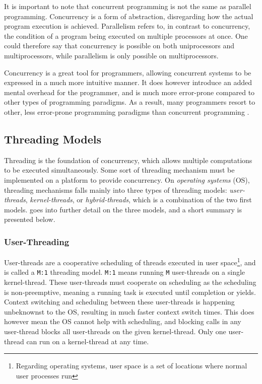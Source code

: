 It is important to note that concurrent programming is not the same as parallel programming. Concurrency is a form of abstraction, disregarding how the actual program execution is achieved. Parallelism refers to, in contrast to concurrency, the condition of a program being executed on multiple processors at once. One could therefore say that concurrency is possible on both uniprocessors and multiprocessors, while parallelism is only possible on multiprocessors.

Concurrency is a great tool for programmers, allowing concurrent systems to be expressed in a much more intuitive manner. It does however introduce an added mental overhead for the programmer, and is much more error\hyp{}prone compared to other types of programming paradigms. As a result, many programmers resort to other, less error\hyp{}prone programming paradigms than concurrent programming \citep{mordechai2006principles}.


\subsection{Threading Models}
\label{subsec:threading_models}


Threading is the foundation of concurrency, which allows multiple computations to be executed simultaneously. Some sort of threading mechanism must be implemented on a platform to provide concurrency. On \textit{operating systems} (OS), threading mechanisms falls mainly into three types of threading models: \textit{user\hyp{}threads}, \textit{kernel\hyp{}threads}, or \textit{hybrid\hyp{}threads}, which is a combination of the two first models. \citet{brown2007c++csp2} goes into further detail on the three models, and a short summary is presented below.


\subsubsection{User\hyp{}Threading}


User\hyp{}threads are a cooperative scheduling of threads executed in user space\footnote{Regarding operating systems, user space is a set of locations where normal user processes run}, and is called a \texttt{M:1} threading model. \texttt{M:1} means running \texttt{M} user\hyp{}threads on a single kernel\hyp{}thread. These user\hyp{}threads must cooperate on scheduling as the scheduling is non\hyp{}preemptive, meaning a running task is executed until completion or yields. Context switching and scheduling between these user\hyp{}threads is happening unbeknownst to the OS, resulting in much faster context switch times. This does however mean the OS cannot help with scheduling, and blocking calls in any user\hyp{}thread blocks all user\hyp{}threads on the given kernel\hyp{}thread. Only one user\hyp{}thread can run on a kernel\hyp{}thread at any time.


